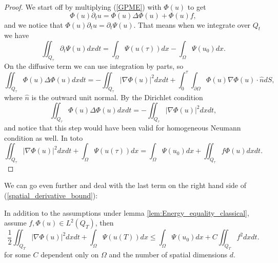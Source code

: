 \documentclass[11pt, a4paper]{article}
\begin{document}
\begin{proof}
We start off by multiplying (\ref{GPME}) with $\Phi(u)$ to get
\begin{equation*}
\Phi(u)\partial_t u = \Phi(u)\Delta \Phi(u) + \Phi(u)f,
\end{equation*}
and we notice that $\Phi(u)\partial_t u = \partial_t \Psi(u)$. That means when we integrate over $Q_t$ we have
\begin{equation*}
\iint_{Q_\tau} \partial_t \Psi(u)dxdt = \int_\Omega \Psi(u(\tau))dx - \int_\Omega \Psi(u_0)dx.
\end{equation*}
On the diffusive term we can use integration by parts, so
\begin{equation*}
\iint_{Q_\tau}\Phi(u) \Delta \Phi(u) dxdt = -\iint_{Q_\tau} |\nabla \Phi(u)|^2dxdt + \int_0^\tau \int_{\partial\Omega} \Phi(u)\nabla \Phi(u) \cdot \hat{n}dS,
\end{equation*}
where $\hat{n}$ is the outward unit normal. By the Dirichlet condition
\begin{equation*}
\iint_{Q_\tau}\Phi(u) \Delta \Phi(u) dxdt = -\iint_{Q_\tau} |\nabla \Phi(u)|^2dxdt,
\end{equation*}
and notice that this step would have been valid for homogeneous Neumann condition as well. In toto 
\begin{equation*}
\iint_{Q_\tau} |\nabla \Phi(u)|^2dxdt + \int_\Omega \Psi(u(\tau))dx = \int_\Omega \Psi(u_0)dx + \iint_{Q_\tau} f\Phi(u)dxdt.
\end{equation*}
\end{proof}
\setcounter{obs}{0}

We can go even further and deal with the last term on the right hand side of (\ref{spatial_derivative_bound}):

\begin{cor}
\label{cor:spatial_bound_w_poincare}
In addition to the assumptions under lemma \ref{lem:Energy_equality_classical}, assume $f,\Phi(u) \in L^2(Q_T)$, then
\begin{equation}
\label{spatial_derivative_bound_w_poincare}
\frac{1}{2}\iint_{Q_T}|\nabla \Phi(u)|^2dxdt + \int_\Omega \Psi(u(T))dx \leq \int_\Omega \Psi(u_0)dx + C\iint_{Q_T}f^2dxdt.
\end{equation}
for some $C$ dependent only on $\Omega$ and the number of spatial dimensions $d$.
\end{cor}
\end{document}
